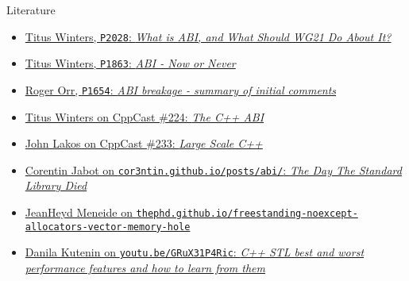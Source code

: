 \begin{frame}{Literature}
    \begin{itemize}
        \item \href{http://www.open-std.org/jtc1/sc22/wg21/docs/papers/2020/p2028r0.pdf}{Titus Winters, \texttt{P2028}: \textit{What is ABI, and What Should WG21 Do About It?}}
        \item \href{http://www.open-std.org/jtc1/sc22/wg21/docs/papers/2020/p1863r1.pdf}{Titus Winters, \texttt{P1863}: \textit{ABI - Now or Never}}
        \item \href{http://open-std.org/JTC1/SC22/WG21/docs/papers/2020/p1654r1.html}{Roger Orr, \texttt{P1654}: \textit{ABI breakage - summary of initial comments}}
        \item \href{https://cppcast.com/titus-winters-abi/}{Titus Winters on CppCast \#224: \textit{The C++ ABI}}
        \item \href{https://cppcast.com/john-lakos-large-scale-cpp/}{John Lakos on CppCast \#233: \textit{Large Scale C++}}
        \item \href{https://cor3ntin.github.io/posts/abi/}{Corentin Jabot on \texttt{cor3ntin.github.io/posts/abi/}: \textit{The Day The Standard Library Died}}
        \item \href{https://thephd.github.io/freestanding-noexcept-allocators-vector-memory-hole}{JeanHeyd Meneide on \texttt{thephd.github.io/freestanding-noexcept-allocators-vector-memory-hole}}
        \item \href{https://youtu.be/GRuX31P4Ric}{Danila Kutenin on \texttt{youtu.be/GRuX31P4Ric}: \textit{C++ STL best and worst performance features and how to learn from them}}
    \end{itemize}
\end{frame}
